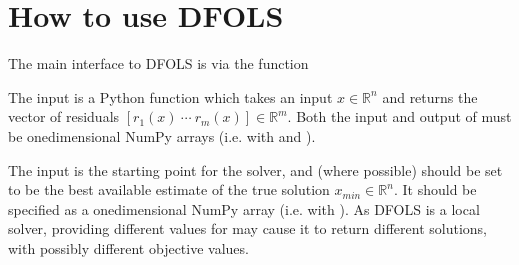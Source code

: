 \documentclass[letterpaper,10pt,english]{sphinxmanual}
\begin{document}
\section{How to use DFO\sphinxhyphen{}LS}
\label{\detokenize{userguide:how-to-use-dfo-ls}}
\sphinxAtStartPar
The main interface to DFO\sphinxhyphen{}LS is via the function 
\begin{quote}

\begin{sphinxVerbatim}[commandchars=\\\{\}]
   
\end{sphinxVerbatim}
\end{quote}

\sphinxAtStartPar
The input  is a Python function which takes an input \(x\in\mathbb{R}^n\) and returns the vector of residuals \([r_1(x)\: \cdots \: r_m(x)]\in\mathbb{R}^m\). Both the input and output of  must be one\sphinxhyphen{}dimensional NumPy arrays (i.e. with  and ).

\sphinxAtStartPar
The input  is the starting point for the solver, and (where possible) should be set to be the best available estimate of the true solution \(x_{min}\in\mathbb{R}^n\). It should be specified as a one\sphinxhyphen{}dimensional NumPy array (i.e. with ).
As DFO\sphinxhyphen{}LS is a local solver, providing different values for  may cause it to return different solutions, with possibly different objective values.
\end{document}

